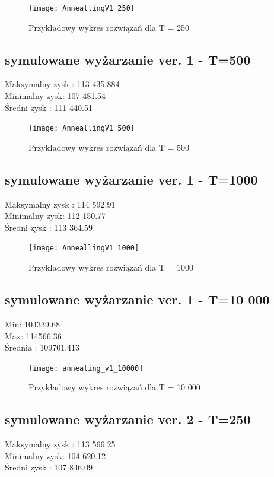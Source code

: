 \documentclass{article}
\begin{document}
\begin{figure}[H]
	\centering
	\texttt{[image: AnneallingV1\_250]}
	\caption{Przykładowy wykres rozwiązań dla T = 250}
	\label{fig:anneallingv1250}
\end{figure}


\subsection{symulowane wyżarzanie ver. 1 - T=500}
Maksymalny zysk : 113 435.884\\
Minimalny zysk: 107 481.54\\
Średni zysk : 111 440.51\\

\begin{figure}[H]
	\centering
	\texttt{[image: AnneallingV1\_500]}
	\caption{Przykładowy wykres rozwiązań dla T = 500}
	\label{fig:anneallingv1500}
\end{figure}


\subsection{symulowane wyżarzanie ver. 1 - T=1000}
Maksymalny zysk : 114 592.91\\
Minimalny zysk: 112 150.77\\
Średni zysk : 113 364.59\\



\begin{figure}[H]
	\centering
	\texttt{[image: AnneallingV1\_1000]}
	\caption{Przykładowy wykres rozwiązań dla T = 1000}
	\label{fig:anneallingv11000}
\end{figure}

\subsection{symulowane wyżarzanie ver. 1 - T=10 000}
Min: 104339.68\\
Max: 114566.36\\
Średnia : 109701.413\\

\begin{figure}[H]
	\centering
	\texttt{[image: annealing\_v1\_10000]}
	\caption{Przykładowy wykres rozwiązań dla T = 10 000}
	\label{fig:annealingv110000}
\end{figure}



\subsection{symulowane wyżarzanie ver. 2 - T=250}
Maksymalny zysk :  113 566.25 \\
Minimalny zysk: 104 620.12 \\
Średni zysk : 107 846.09 \\
\end{document}
